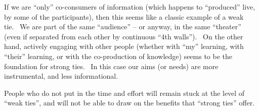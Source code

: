 If we are ``only'' co-consumers of information (which happens to
``produced'' live, by some of the participants), then this seems like a
classic example of a weak tie.~ We are part of the same ``audience'' --
or anyway, in the same ``theater'' (even if separated from each other by
continuous ``4th walls'').~ On the other hand, actively engaging with
other people (whether with ``my'' learning, with ``their'' learning, or
with the co-production of knowledge) seems to be the foundation for
strong ties.~ In this case our aims (or needs) are more instrumental,
and less informational.

People who do not put in the time and effort will remain stuck at the
level of ``weak ties'', and will not be able to draw on the benefits
that ``strong ties'' offer.
